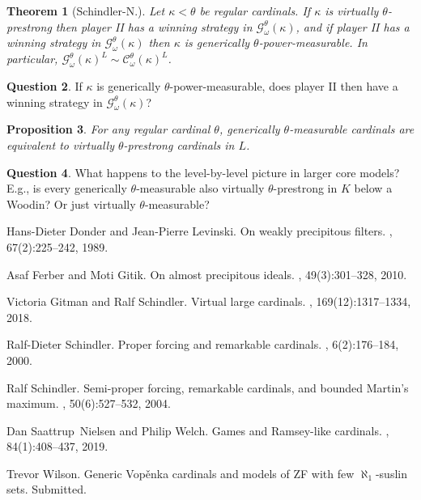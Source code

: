 \documentclass{amsart}
\newtheorem{theorem}{Theorem}[section]
\newtheorem{proposition}[theorem]{Proposition}
\theoremstyle{definition}
\newtheorem{question}[theorem]{Question}
\newcommand{\C}{\mathcal C}
\newcommand{\G}{\mathcal G}
\begin{document}
\begin{theorem}[Schindler-N.]
  Let $\kappa<\theta$ be regular cardinals. If $\kappa$ is virtually $\theta$-prestrong then player II has a winning strategy in $\G^\theta_\omega(\kappa)$, and if player II has a winning strategy in $\G_\omega^\theta(\kappa)$ then $\kappa$ is generically $\theta$-power-measurable. In particular, $\G^\theta_\omega(\kappa)^L\sim\C^\theta_\omega(\kappa)^L$.
\end{theorem}

\begin{question} 
If $\kappa$ is generically $\theta$-power-measurable, does player II then have a winning strategy in $\mathcal{G}^\theta_\omega(\kappa)$? 
\end{question} 

\begin{proposition}
  For any regular cardinal $\theta$, generically $\theta$-measurable cardinals are equivalent to virtually $\theta$-prestrong cardinals in $L$.
\end{proposition}

\begin{question} 
What happens to the level-by-level picture in larger core models? E.g., is every generically $\theta$-measurable also virtually $\theta$-prestrong in $K$ below a Woodin? Or just virtually $\theta$-measurable?
\end{question} 

%
%

\begin{thebibliography}{SNW19}

Hans-Dieter Donder and Jean-Pierre Levinski.
\newblock On weakly precipitous filters.
, 67(2):225--242, 1989.

Asaf Ferber and Moti Gitik.
\newblock On almost precipitous ideals.
, 49(3):301--328, 2010.

Victoria Gitman and Ralf Schindler.
\newblock Virtual large cardinals.
, 169(12):1317--1334, 2018.

Ralf-Dieter Schindler.
\newblock Proper forcing and remarkable cardinals.
, 6(2):176--184, 2000.

Ralf Schindler.
\newblock Semi-proper forcing, remarkable cardinals, and bounded {M}artin's
  maximum.
, 50(6):527--532, 2004.

Dan Saattrup~Nielsen and Philip Welch.
\newblock Games and {R}amsey-like cardinals.
, 84(1):408--437, 2019.

Trevor Wilson.
\newblock Generic {V}op\v enka cardinals and models of {ZF} with few
  {$\aleph_1$}-suslin sets.
\newblock Submitted.

\end{thebibliography}

\fi 
\end{document}
